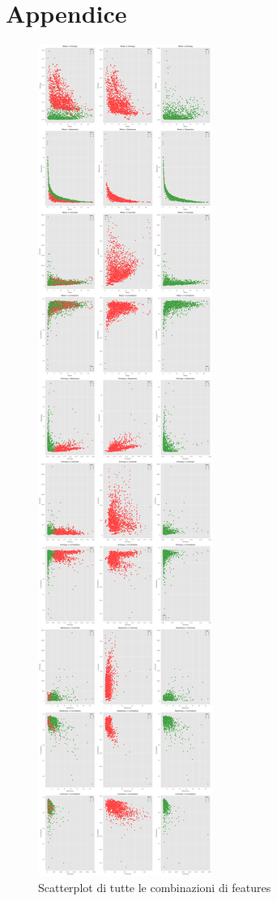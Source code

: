 \chapter*{Appendice}
\begin{figure}[!ht]
    \centering
    \includegraphics[height=0.95\textheight]{img/analisi/scatterplot.png}
    \caption{Scatterplot di tutte le combinazioni di features}
    \label{fig:scatterplot_features}
\end{figure}